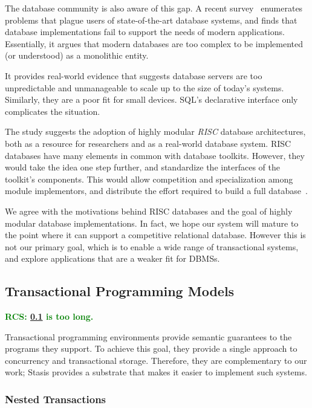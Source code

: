 \documentclass[letterpaper,twocolumn,10pt]{article}
\newcommand{\yad}{Stasis\xspace}
\newcommand{\rcs}[1]{\textcolor{green}{\bf RCS: #1}}
\begin{document}
The database community is also aware of this gap.  A recent
survey~\cite{riscDB} enumerates problems that plague users of
state-of-the-art database systems, and finds that database
implementations fail to support the needs of modern applications.
Essentially, it argues that modern databases are too complex to be
implemented (or understood) as a monolithic entity.

It provides real-world evidence that suggests database servers are too
unpredictable and unmanageable to scale up to the size of today's
systems.  Similarly, they are a poor fit for small devices.  SQL's
declarative interface only complicates the situation.

The study suggests the adoption of highly modular {\em RISC} database
architectures, both as a resource for researchers and as a real-world
database system.  RISC databases have many elements in common with
database toolkits.  However, they would take the idea one step
further, and standardize the interfaces of the toolkit's components.
This would allow competition and specialization among module
implementors, and distribute the effort required to build a full
database~\cite{riscDB}.

We agree with the motivations behind RISC databases and the goal
of highly modular database implementations.  In fact, we  hope
 our system will mature to the point where it can support a
competitive relational database.  However this is not our primary
goal, which is to enable a wide range of transactional systems, and
explore applications that are a weaker fit for DBMSs.

\subsection{Transactional Programming Models}

\label{sec:transactionalProgramming}

\rcs{\ref{sec:transactionalProgramming} is too long.}

Transactional programming environments provide semantic guarantees to
the programs they support.  To achieve this goal, they provide a
single approach to concurrency and transactional storage.
Therefore, they are complementary to our work; \yad provides a
substrate that makes it easier to implement such systems.

\subsubsection{Nested Transactions}
\end{document}
